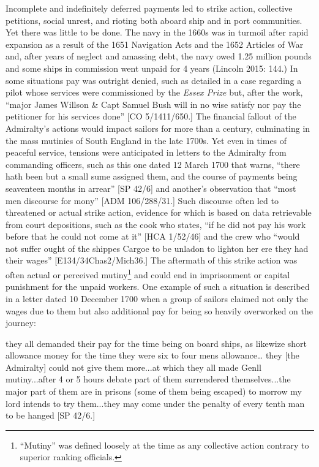 \begin{styleStandard}
Incomplete and indefinitely deferred payments led to strike action, collective petitions, social unrest, and rioting both aboard ship and in port communities. Yet there was little to be done. The navy in the 1660s was in turmoil after rapid expansion as a result of the 1651 Navigation Acts and the 1652 Articles of War and, after years of neglect and amassing debt, the navy owed 1.25 million pounds and some ships in commission went unpaid for 4 years (Lincoln 2015: 144.) In some situations pay was outright denied, such as detailed in a case regarding a pilot whose services were commissioned by the \textit{Essex Prize} but, after the work, “major James Willson \& Capt Samuel Bush will in no wise satisfy nor pay the petitioner for his services done” [CO 5/1411/650.] The financial fallout of the Admiralty’s actions would impact sailors for more than a century, culminating in the mass mutinies of South England in the late 1700s. Yet even in times of peaceful service, tensions were anticipated in letters to the Admiralty from commanding officers, such as this one dated 12 March 1700 that warns, “there hath been but a small sume assigned them, and the course of payments being seaventeen months in arrear” [SP 42/6] and another’s observation that “most men discourse for mony” [ADM 106/288/31.] Such discourse often led to threatened or actual strike action, evidence for which is based on data retrievable from court depositions, such as the cook who states, “if he did not pay his work before that he could not come at it” [HCA 1/52/46] and the crew who “would not suffer ought of the shippes Cargoe to be unladon to lighton her ere they had their wages” [E134/34Chas2/Mich36.] The aftermath of this strike action was often actual or perceived mutiny\footnote{ “Mutiny” was defined loosely at the time as any collective action contrary to superior ranking officials.} and could end in imprisonment or capital punishment for the unpaid workers. One example of such a situation is described in a letter dated 10 December 1700 when a group of sailors claimed not only the wages due to them but also additional pay for being so heavily overworked on the journey:
\end{styleStandard}

\begin{styleStandard}
they all demanded their pay for the time being on board ships, as likewize short allowance money for the time they were six to four mens allowance… they [the Admiralty] could not give them more...at which they all made Genll mutiny...after 4 or 5 hours debate part of them surrendered themselves...the major part of them are in prisons (some of them being escaped) to morrow my lord intends to try them...they may come under the penalty of every tenth man to be hanged{\textquotedbl} [SP 42/6.]
\end{styleStandard}

